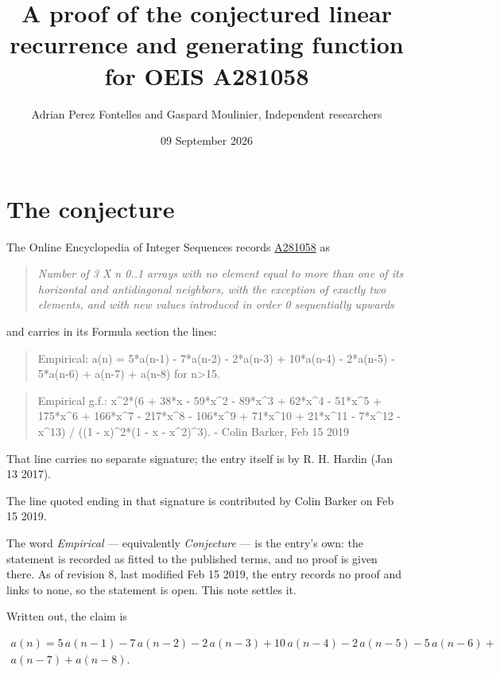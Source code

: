 \documentclass[11pt]{article}
\title{A proof of the conjectured linear recurrence and generating function for OEIS A281058}
\author{Adrian Perez Fontelles and Gaspard Moulinier, Independent researchers}
\date{09 September 2026}
\theoremstyle{definition}
\begin{document}
\maketitle
\section{The conjecture}

The Online Encyclopedia of Integer Sequences records \href{https://oeis.org/A281058}{A281058} as

\begin{quote}\itshape Number of 3 X n 0..1 arrays with no element equal to more than one of its horizontal and antidiagonal neighbors, with the exception of exactly two elements, and with new values introduced in order 0 sequentially upwards\end{quote}

and carries in its Formula section the lines:

\begin{quote}\ttfamily Empirical: a(n) = 5*a(n-1) - 7*a(n-2) - 2*a(n-3) + 10*a(n-4) - 2*a(n-5) - 5*a(n-6) + a(n-7) + a(n-8) for n>15.\end{quote}

\begin{quote}\ttfamily Empirical g.f.: x\textasciicircum{}2*(6 + 38*x - 59*x\textasciicircum{}2 - 89*x\textasciicircum{}3 + 62*x\textasciicircum{}4 - 51*x\textasciicircum{}5 + 175*x\textasciicircum{}6 + 166*x\textasciicircum{}7 - 217*x\textasciicircum{}8 - 106*x\textasciicircum{}9 + 71*x\textasciicircum{}10 + 21*x\textasciicircum{}11 - 7*x\textasciicircum{}12 - x\textasciicircum{}13) / ((1 - x)\textasciicircum{}2*(1 - x - x\textasciicircum{}2)\textasciicircum{}3). - Colin Barker, Feb 15 2019\end{quote}

That line carries no separate signature; the entry itself is by R. H. Hardin (Jan 13 2017).

The line quoted ending in that signature is contributed by Colin Barker on Feb 15 2019.

The word {\itshape Empirical} --- equivalently {\itshape Conjecture} --- is the entry's own: the statement is recorded as fitted to the published terms, and no proof is given there. As of revision 8, last modified Feb 15 2019, the entry records no proof and links to none, so the statement is open. This note settles it.

Written out, the claim is

\begin{multline*} a(n) = 5\,a(n-1) - 7\,a(n-2) - 2\,a(n-3) + 10\,a(n-4) - 2\,a(n-5) - 5\,a(n-6) + \\ a(n-7) + a(n-8). \end{multline*}
\end{document}
